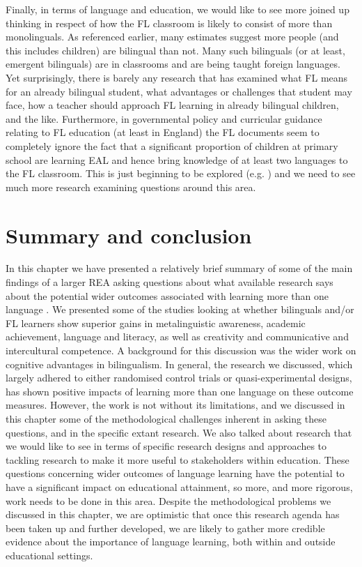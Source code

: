 \documentclass[output=paper]{langscibook}
\begin{document}
Finally, in terms of language and education, we would like to see more joined up thinking in respect of how the FL classroom is likely to consist of more than monolinguals. As referenced earlier, many estimates suggest more people (and this includes children) are bilingual than not. Many such bilinguals (or at least, emergent bilinguals) are in classrooms and are being taught foreign languages. Yet surprisingly, there is barely any research that has examined what FL means for an already bilingual student, what advantages or challenges that student may face, how a teacher should approach FL learning in already bilingual children, and the like. Furthermore, in governmental policy and curricular guidance relating to FL education (at least in England) the FL documents seem to completely ignore the fact that a significant proportion of children at primary school are learning EAL and hence bring knowledge of at least two languages to the FL classroom. This is just beginning to be explored (e.g. \citealt{CostleyEtAl2020}) and we need to see much more research examining questions around this area. 

\section{Summary and conclusion}

In this chapter we have presented a relatively brief summary of some of the main findings of a larger REA asking questions about what available research says about the potential wider outcomes associated with learning more than one language \citep{MurphyEtAl2020}. We presented some of the studies looking at whether bilinguals and/or FL learners show superior gains in metalinguistic awareness, academic achievement, language and literacy, as well as creativity and communicative and intercultural competence. A background for this discussion was the wider work on cognitive advantages in bilingualism. In general, the research we discussed, which largely adhered to either randomised control trials or quasi-experimental designs, has shown positive impacts of learning more than one language on these outcome measures. However, the work is not without its limitations, and we discussed in this chapter some of the methodological challenges inherent in asking these questions, and in the specific extant research. We also talked about research that we would like to see in terms of specific research designs and approaches to tackling research to make it more useful to stakeholders within education. These questions concerning wider outcomes of language learning have the potential to have a significant impact on educational attainment, so more, and more rigorous, work needs to be done in this area. Despite the methodological problems we discussed in this chapter, we are optimistic that once this research agenda has been taken up and further developed, we are likely to gather more credible evidence about the importance of language learning, both within and outside educational settings. 
\end{document}
